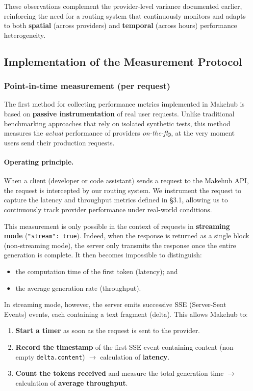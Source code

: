 \documentclass[english]{article}
\begin{document}
\noindent These observations complement the provider-level variance documented earlier, reinforcing the need for a routing system that continuously monitors and adapts to both \textbf{spatial} (across providers) and \textbf{temporal} (across hours) performance heterogeneity.

\subsection{Implementation of the Measurement Protocol}

\subsubsection{Point-in-time measurement (per request)}

The first method for collecting performance metrics implemented in Makehub is based on \textbf{passive instrumentation} of real user requests. Unlike traditional benchmarking approaches that rely on isolated synthetic tests, this method measures the \emph{actual} performance of providers \emph{on-the-fly}, at the very moment users send their production requests.

\paragraph{Operating principle.}

When a client (developer or code assistant) sends a request to the Makehub API, the request is intercepted by our routing system. We instrument the request to capture the latency and throughput metrics defined in §3.1, allowing us to continuously track provider performance under real-world conditions.

This measurement is only possible in the context of requests in \textbf{streaming mode} (\texttt{"stream": true}). Indeed, when the response is returned as a single block (non-streaming mode), the server only transmits the response once the entire generation is complete. It then becomes impossible to distinguish:
\begin{itemize}
    \item the computation time of the first token (latency); and
    \item the average generation rate (throughput).
\end{itemize}

In streaming mode, however, the server emits successive SSE (Server-Sent Events) events, each containing a text fragment (delta). This allows Makehub to:
\begin{enumerate}
    \item \textbf{Start a timer} as soon as the request is sent to the provider.
    \item \textbf{Record the timestamp} of the first SSE event containing content (non-empty \texttt{delta.content}) $\rightarrow$ calculation of \textbf{latency}.
    \item \textbf{Count the tokens received} and measure the total generation time $\rightarrow$ calculation of \textbf{average throughput}.
\end{enumerate}
\end{document}
